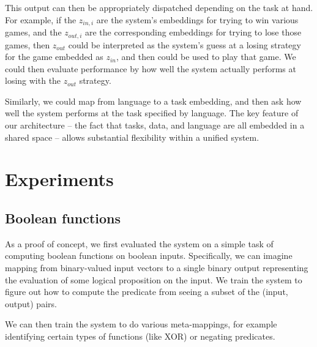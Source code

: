 \documentclass[11pt]{article}
\begin{document}
This output can then be appropriately dispatched depending on the task at hand. For example, if the $z_{in,i}$ are the system's embeddings for trying to win various games, and the $z_{out,i}$ are the corresponding embeddings for trying to lose those games, then $z_{out}$ could be interpreted as the system's guess at a losing strategy for the game embedded as $z_{in}$, and then could be used to play that game. We could then evaluate performance by how well the system actually performs at losing with the $z_{out}$ strategy. \par
Similarly, we could map from language to a task embedding, and then ask how well the system performs at the task specified by language. The key feature of our architecture -- the fact that tasks, data, and language are all embedded in a shared space -- allows substantial flexibility within a unified system. 

\section{Experiments}

\subsection{Boolean functions}
As a proof of concept, we first evaluated the system on a simple task of computing boolean functions on boolean inputs. Specifically, we can imagine mapping from binary-valued input vectors to a single binary output representing the evaluation of some logical proposition on the input. We train the system to figure out how to compute the predicate from seeing a subset of the (input, output) pairs. \par   
We can then train the system to do various meta-mappings, for example identifying certain types of functions (like XOR) or negating predicates. \par
\end{document}
